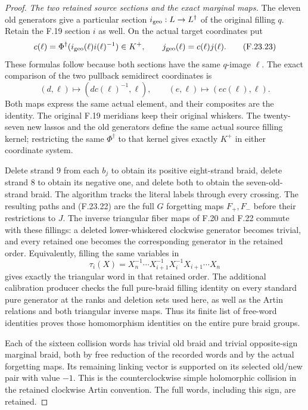 \begin{proof}
\emph{The two retained source sections and the exact marginal maps.}
The eleven old generators give a particular section
$i_{\rm geo}:L\to L^\dagger$ of the original filling $q$.
Retain the F.19 section $i$ as well. On the actual target
coordinates put
\[
 c(\ell)=\Phi^\dagger(i_{\rm geo}(\ell)i(\ell)^{-1})\in K^+,
       \qquad j_{\rm geo}(\ell)=c(\ell)j(\ell).                \tag{F.23.23}
\]
These formulas follow because both sections have the same
$q$-image $\ell$. The exact comparison of the two pullback
semidirect coordinates is
\[
 (d,\ell)\longmapsto(d c(\ell)^{-1},\ell),
       \qquad(e,\ell)\longmapsto(e c(\ell),\ell).              \tag{F.23.24}
\]
Both maps express the same actual element, and their
composites are the identity. The original F.19 meridians
keep their original whiskers. The twenty-seven new lassos
and the old generators define the same actual source
filling kernel; restricting the same $\Phi^\dagger$ to
that kernel gives exactly $K^+$ in either coordinate system.

Delete strand $9$ from each $b_j$ to obtain its positive
eight-strand braid, delete strand $8$ to obtain its negative
one, and delete both to obtain the seven-old-strand braid.
The algorithm tracks the literal labels through every crossing.
The resulting paths and (F.23.22) are the full $G$ forgetting
maps $F_+,F_-$ before their restrictions to $J$.
The inverse triangular fiber maps of F.20 and F.22 commute
with these fillings: a deleted lower-whiskered clockwise
generator becomes trivial, and every retained one becomes
the corresponding generator in the retained order.
Equivalently, filling the same variables in
\[
 \tau_i(X)=X_n^{-1}\cdots X_{i+1}^{-1}
                         X_i^{-1}X_{i+1}\cdots X_n
                                                               \tag{F.23.25}
\]
gives exactly the triangular word in that retained order.
The additional calibration producer checks the full pure-braid
filling identity on every standard pure generator at the ranks
and deletion sets used here, as well as the Artin relations and
both triangular inverse maps. Thus its finite list of free-word
identities proves those homomorphism identities on the entire
pure braid groups.

Each of the sixteen collision words has trivial old braid and
trivial opposite-sign marginal braid, both by free reduction
of the recorded words and by the actual forgetting maps.
Its remaining linking vector is supported on its selected
old/new pair with value $-1$. This is the counterclockwise
simple holomorphic collision in the retained clockwise Artin
convention. The full words, including this sign, are retained.


\end{proof}
